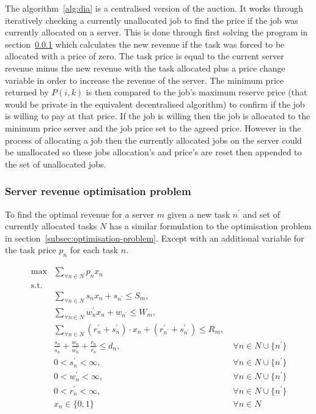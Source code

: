 The algorithm~\ref{alg:dia} is a centralised version of the auction. It works through iteratively checking a currently
unallocated job to find the price if the job was currently allocated on a server. This is done through first solving
the program in section~\ref{subsubsec:decentralised-iterative-problem} which calculates the new revenue if the task was
forced to be allocated with a price of zero. The task price is equal to the current server revenue minus the new
revenue with the task allocated plus a price change variable in order to increase the revenue of the server. The
minimum price returned by $P(i, k)$ is then compared to the job's maximum reserve price (that would be private in the
equivalent decentralised algorithm) to confirm if the job is willing to pay at that price. If the job is willing then
the job is allocated to the minimum price server and the job price set to the agreed price. However in the process of
allocating a job then the currently allocated jobs on the server could be unallocated so these jobs allocation's and
price's are reset then appended to the set of unallocated jobs.

\subsubsection{Server revenue optimisation problem}
\label{subsubsec:decentralised-iterative-problem}
To find the optimal revenue for a server $m$ given a new task $n^{'}$ and set of currently allocated tasks $N$ has a
similar formulation to the optimisation problem in section~\ref{subsec:optimisation-problem}. Except with an additional
variable for the task price $p_n$ for each task $n$.

\begin{align}
    \max & \sum_{\forall n \in N} p_n x_n\label{eq:dia-objective}\\
    \mbox{s.t.} \nonumber \\
    & \sum_{\forall n \in N} s_n x_n + s_{n^{'}} \leq S_m,\label{eq:dia-server-storage-constraint}\\
    & \sum_{\forall n \in N} w^{'}_n x_n + w_{n^{'}} \leq W_m, \label{eq:dia-server-computation-constraint}\\
    & \sum_{\forall n \in N} (r^{'}_n + s^{'}_n) \cdot x_n + (r^{'}_{n^{'}} + s^{'}_{n^{'}}) \leq R_m, \label{eq:dia-server-communication-constraint}\\
    & \frac{s_n}{s^{'}_n} + \frac{w_n}{w^{'}_n} + \frac{r_n}{r^{'}_n} \leq d_n, &~ \forall n \in N \cup \{n^{'}\} \label{eq:dia-task-deadline}\\
    & 0 < s^{'}_n < \infty, &~ \forall{n \in N \cup \{n^{'}\}} \label{eq:dia-loading-speeds}\\
    & 0 < w^{'}_n < \infty, &~ \forall{n \in N \cup \{n^{'}\}} \label{eq:dia-compute-speeds}\\
    & 0 < r^{'}_n < \infty, &~ \forall{n \in N \cup \{n^{'}\}} \label{eq:dia-sending-speeds}\\
    & x_n \in \{0,1\} &~ \forall{n \in N} \label{eq:dia-job-allocation}
\end{align}

